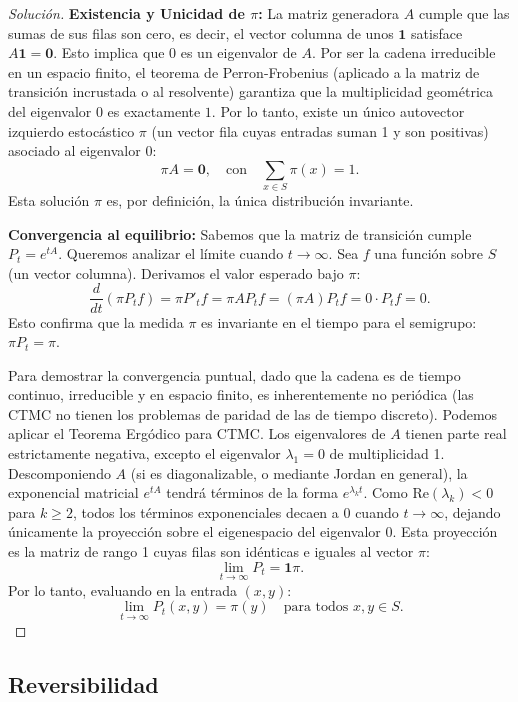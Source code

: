 \documentclass[10pt,a4paper]{article}
\begin{document}
\begin{proof}[Solución]
    \textbf{Existencia y Unicidad de $\pi$:}
    La matriz generadora $A$ cumple que las sumas de sus filas son cero, es decir, el vector columna de unos $\mathbf{1}$ satisface $A \mathbf{1} = \mathbf{0}$. Esto implica que $0$ es un eigenvalor de $A$.
    Por ser la cadena irreducible en un espacio finito, el teorema de Perron-Frobenius (aplicado a la matriz de transición incrustada o al resolvente) garantiza que la multiplicidad geométrica del eigenvalor $0$ es exactamente $1$.
    Por lo tanto, existe un único autovector izquierdo estocástico $\pi$ (un vector fila cuyas entradas suman 1 y son positivas) asociado al eigenvalor $0$:
    \[ \pi A = \mathbf{0}, \quad \text{con} \quad \sum_{x \in S} \pi(x) = 1. \]
    Esta solución $\pi$ es, por definición, la única distribución invariante.

    \textbf{Convergencia al equilibrio:}
    Sabemos que la matriz de transición cumple $P_t = e^{tA}$. Queremos analizar el límite cuando $t \to \infty$.
    Sea $f$ una función sobre $S$ (un vector columna). Derivamos el valor esperado bajo $\pi$:
    \[ \frac{d}{dt} (\pi P_t f) = \pi P'_t f = \pi A P_t f = (\pi A) P_t f = 0 \cdot P_t f = 0. \]
    Esto confirma que la medida $\pi$ es invariante en el tiempo para el semigrupo: $\pi P_t = \pi$.

    Para demostrar la convergencia puntual, dado que la cadena es de tiempo continuo, irreducible y en espacio finito, es inherentemente no periódica (las CTMC no tienen los problemas de paridad de las de tiempo discreto).
    Podemos aplicar el Teorema Ergódico para CTMC. Los eigenvalores de $A$ tienen parte real estrictamente negativa, excepto el eigenvalor $\lambda_1 = 0$ de multiplicidad 1.
    Descomponiendo $A$ (si es diagonalizable, o mediante Jordan en general), la exponencial matricial $e^{tA}$ tendrá términos de la forma $e^{\lambda_k t}$. Como $\text{Re}(\lambda_k) < 0$ para $k \ge 2$, todos los términos exponenciales decaen a 0 cuando $t \to \infty$, dejando únicamente la proyección sobre el eigenespacio del eigenvalor 0.
    Esta proyección es la matriz de rango 1 cuyas filas son idénticas e iguales al vector $\pi$:
    \[ \lim_{t\to\infty} P_t = \mathbf{1} \pi. \]
    Por lo tanto, evaluando en la entrada $(x,y)$:
    \[ \lim_{t\to\infty} P_t(x,y) = \pi(y) \quad \text{para todos } x,y \in S. \] 
\end{proof}

\newpage

\subsection{Reversibilidad}
\end{document}
